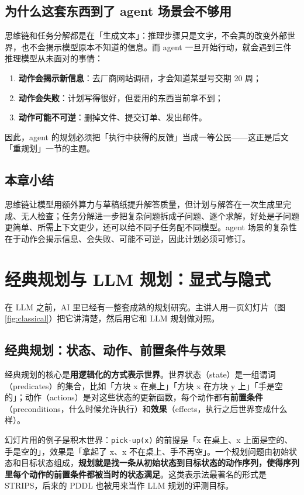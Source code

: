 \documentclass[a4paper]{article}
\begin{document}
\subsection{为什么这套东西到了 agent 场景会不够用}

思维链和任务分解都是在「生成文本」：推理步骤只是文字，不会真的改变外部世界，也不会揭示模型原本不知道的信息。而 agent 一旦开始行动，就会遇到三件推理模型从未面对的事情：

\begin{enumerate}
\item \textbf{动作会揭示新信息}：去厂商网站调研，才会知道某型号交期 20 周；
\item \textbf{动作会失败}：计划写得很好，但要用的东西当前拿不到；
\item \textbf{动作可能不可逆}：删掉文件、提交订单、发出邮件。
\end{enumerate}

因此，agent 的规划必须把「执行中获得的反馈」当成一等公民——这正是后文「重规划」一节的主题。

\subsection{本章小结}
思维链让模型用额外算力与草稿纸提升解答质量，但计划与解答在一次生成里完成、无人检查；任务分解进一步把复杂问题拆成子问题、逐个求解，好处是子问题更简单、所需上下文更少，还可以给不同子任务配不同模型。agent 场景的复杂性在于动作会揭示信息、会失败、可能不可逆，因此计划必须可修订。

\section{经典规划与 LLM 规划：显式与隐式}

在 LLM 之前，AI 里已经有一整套成熟的规划研究。主讲人用一页幻灯片（图 \ref{fig:classical}）把它讲清楚，然后用它和 LLM 规划做对照。

\subsection{经典规划：状态、动作、前置条件与效果}

经典规划的核心是\textbf{用逻辑化的方式表示世界}。世界状态（state）是一组谓词（predicates）的集合，比如「方块 x 在桌上」「方块 x 在方块 y 上」「手是空的」；动作（actions）是对这些状态的更新函数，每个动作都有\textbf{前置条件}（preconditions，什么时候允许执行）和\textbf{效果}（effects，执行之后世界变成什么样）。

幻灯片用的例子是积木世界：\texttt{pick-up(x)} 的前提是「x 在桌上、x 上面是空的、手是空的」，效果是「拿起了 x、x 不在桌上、手不再空」。一个规划问题由初始状态和目标状态组成，\textbf{规划就是找一条从初始状态到目标状态的动作序列，使得序列里每个动作的前置条件都被当时的状态满足}。这类表示法最著名的形式是 STRIPS，后来的 PDDL 也被用来当作 LLM 规划的评测目标。
\end{document}
